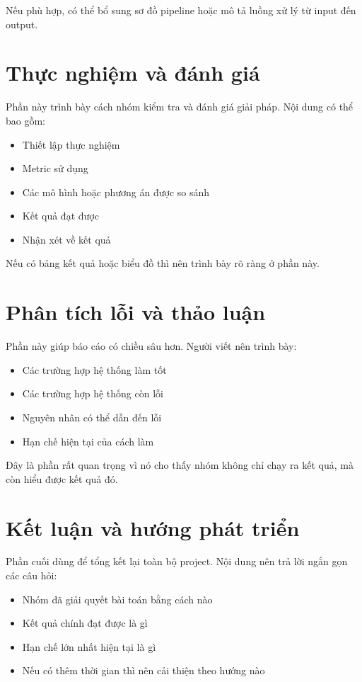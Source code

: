 \documentclass[12pt]{ai_conquer2026}
\begin{document}
Nếu phù hợp, có thể bổ sung sơ đồ pipeline hoặc mô tả luồng xử lý từ input đến output.

\section{Thực nghiệm và đánh giá}

Phần này trình bày cách nhóm kiểm tra và đánh giá giải pháp. Nội dung có thể bao gồm:
\begin{itemize}
    \item Thiết lập thực nghiệm
    \item Metric sử dụng
    \item Các mô hình hoặc phương án được so sánh
    \item Kết quả đạt được
    \item Nhận xét về kết quả
\end{itemize}

Nếu có bảng kết quả hoặc biểu đồ thì nên trình bày rõ ràng ở phần này.

\section{Phân tích lỗi và thảo luận}

Phần này giúp báo cáo có chiều sâu hơn. Người viết nên trình bày:
\begin{itemize}
    \item Các trường hợp hệ thống làm tốt
    \item Các trường hợp hệ thống còn lỗi
    \item Nguyên nhân có thể dẫn đến lỗi
    \item Hạn chế hiện tại của cách làm
\end{itemize}

Đây là phần rất quan trọng vì nó cho thấy nhóm không chỉ chạy ra kết quả, mà còn hiểu được kết quả đó.

\section{Kết luận và hướng phát triển}

Phần cuối dùng để tổng kết lại toàn bộ project. Nội dung nên trả lời ngắn gọn các câu hỏi:
\begin{itemize}
    \item Nhóm đã giải quyết bài toán bằng cách nào
    \item Kết quả chính đạt được là gì
    \item Hạn chế lớn nhất hiện tại là gì
    \item Nếu có thêm thời gian thì nên cải thiện theo hướng nào
\end{itemize}
\end{document}
